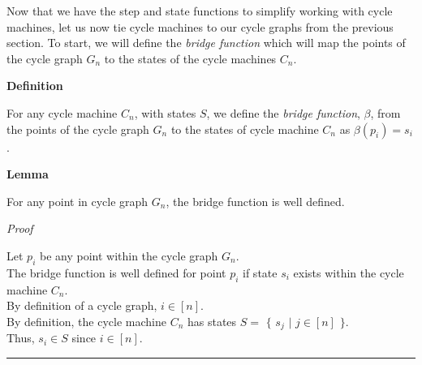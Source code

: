 \documentclass[a4paper,12pt]{article}
\begin{document}
\noindent Now that we have the step and state functions to simplify working with cycle machines, let us now tie cycle machines to our cycle graphs from the previous section. To start, we will define the \textit{bridge function} which will map the points of the cycle graph $G_n$ to the states of the cycle machines $C_n$.\\




\label{definition:bridge_function}
\hypertarget{definition:bridge_function}{}
\begin{tcolorbox}
\textbf{Definition}

\noindent For any cycle machine $C_n$, with states $S$, we define the \textit{bridge function}, $\beta$, from the points of the cycle graph $G_n$ to the states of cycle machine $C_n$ as $\beta(p_i) = s_i$.

\end{tcolorbox}







\label{lemma:bridge_is_well_defined}
\hypertarget{lemma:bridge_is_well_defined}{}
\begin{tcolorbox}
\textbf{Lemma}

\noindent For any point in cycle graph $G_n$, the bridge function is well defined.

\end{tcolorbox}


\noindent
\textsl{Proof}

\noindent Let $p_i$ be any point within the cycle graph $G_n$.\\

\noindent The bridge function is well defined for point $p_i$ if state $s_i$ exists within the cycle machine $C_n$.\\

\noindent By definition of a cycle graph, $i \in [n]$.\\

\noindent By definition, the cycle machine $C_n$ has states $S =$ $\{$ $s_j$ $|$ $j \in [n]$ $\}$.\\

\noindent Thus, $s_i \in S$ since $i \in [n]$.

\begin{center}
\noindent\rule{8cm}{0.4pt}
\end{center}
\end{document}
